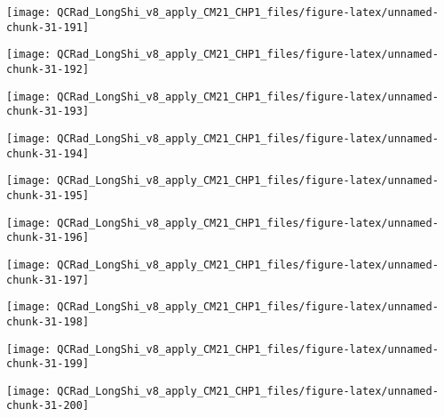 \documentclass[
  10pt,
  a4paper,oneside]{article}
\begin{document}
\begin{center}\texttt{[image: QCRad\_LongShi\_v8\_apply\_CM21\_CHP1\_files/figure-latex/unnamed-chunk-31-191]} \end{center}

\begin{center}\texttt{[image: QCRad\_LongShi\_v8\_apply\_CM21\_CHP1\_files/figure-latex/unnamed-chunk-31-192]} \end{center}

\begin{center}\texttt{[image: QCRad\_LongShi\_v8\_apply\_CM21\_CHP1\_files/figure-latex/unnamed-chunk-31-193]} \end{center}

\begin{center}\texttt{[image: QCRad\_LongShi\_v8\_apply\_CM21\_CHP1\_files/figure-latex/unnamed-chunk-31-194]} \end{center}

\begin{center}\texttt{[image: QCRad\_LongShi\_v8\_apply\_CM21\_CHP1\_files/figure-latex/unnamed-chunk-31-195]} \end{center}

\begin{center}\texttt{[image: QCRad\_LongShi\_v8\_apply\_CM21\_CHP1\_files/figure-latex/unnamed-chunk-31-196]} \end{center}

\begin{center}\texttt{[image: QCRad\_LongShi\_v8\_apply\_CM21\_CHP1\_files/figure-latex/unnamed-chunk-31-197]} \end{center}

\begin{center}\texttt{[image: QCRad\_LongShi\_v8\_apply\_CM21\_CHP1\_files/figure-latex/unnamed-chunk-31-198]} \end{center}

\begin{center}\texttt{[image: QCRad\_LongShi\_v8\_apply\_CM21\_CHP1\_files/figure-latex/unnamed-chunk-31-199]} \end{center}

\begin{center}\texttt{[image: QCRad\_LongShi\_v8\_apply\_CM21\_CHP1\_files/figure-latex/unnamed-chunk-31-200]} \end{center}
\end{document}
